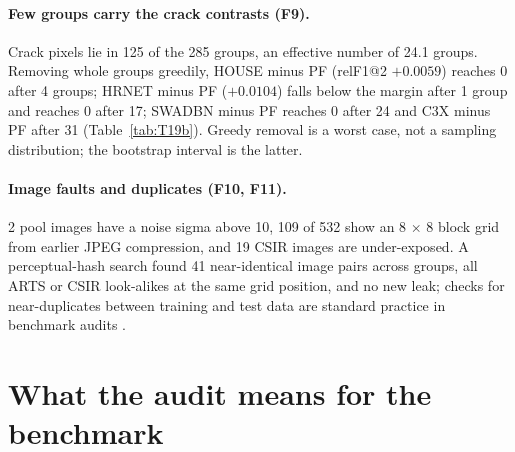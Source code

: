 
\paragraph{Few groups carry the crack contrasts (F9).} Crack pixels lie in 125 of the 285 groups, an effective number of 24.1
groups. Removing whole groups greedily, HOUSE minus PF (relF1@2 $+0.0059$) reaches 0 after 4 groups; HRNET minus PF ($+0.0104$) falls
below the margin after 1 group and reaches 0 after 17; SWADBN minus PF reaches 0 after 24 and C3X minus PF after 31
(Table~\ref{tab:T19b}). Greedy removal is a worst case, not a sampling distribution; the bootstrap interval is the latter.

\paragraph{Image faults and duplicates (F10, F11).} 2 pool images have a noise sigma above 10, 109 of 532
show an 8 $\times$ 8 block grid from earlier JPEG compression, and 19 CSIR images are under-exposed. A perceptual-hash search found
41 near-identical image pairs across groups, all ARTS or CSIR look-alikes at the same grid position, and no new leak; checks for
near-duplicates between training and test data are standard practice in benchmark audits \citep{barz2020cifair}.

\section{What the audit means for the benchmark}\label{sec:data-consequences}

